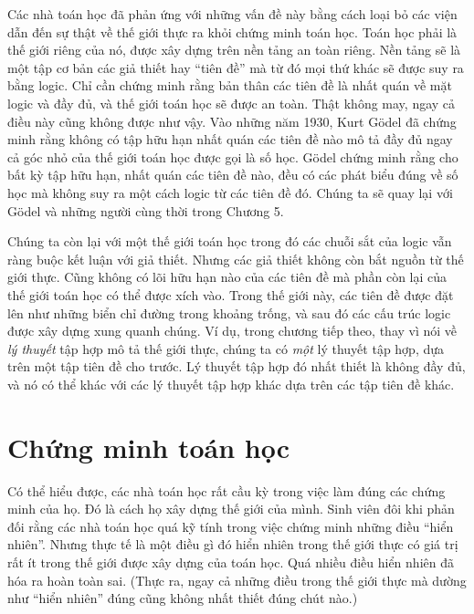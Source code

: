 Các nhà toán học đã phản ứng với những vấn đề này bằng cách loại bỏ các viện dẫn đến sự thật về thế giới thực ra khỏi chứng minh toán học. Toán học phải là thế giới riêng của nó, được xây dựng trên nền tảng an toàn riêng. Nền tảng sẽ là một tập cơ bản các giả thiết hay ``tiên đề'' mà từ đó mọi thứ khác sẽ được suy ra bằng logic. Chỉ cần chứng minh rằng bản thân các tiên đề là nhất quán về mặt logic và đầy đủ, và thế giới toán học sẽ được an toàn. Thật không may, ngay cả điều này cũng không được như vậy. Vào những năm 1930, Kurt Gödel đã chứng minh rằng không có tập hữu hạn nhất quán các tiên đề nào mô tả đầy đủ ngay cả góc nhỏ của thế giới toán học được gọi là số học. Gödel chứng minh rằng cho bất kỳ tập hữu hạn, nhất quán các tiên đề nào, đều có các phát biểu đúng về số học mà không suy ra một cách logic từ các tiên đề đó. Chúng ta sẽ quay lại với Gödel và những người cùng thời trong Chương 5.

Chúng ta còn lại với một thế giới toán học trong đó các chuỗi sắt của logic vẫn ràng buộc kết luận với giả thiết. Nhưng các giả thiết không còn bắt nguồn từ thế giới thực. Cũng không có lõi hữu hạn nào của các tiên đề mà phần còn lại của thế giới toán học có thể được xích vào. Trong thế giới này, các tiên đề được đặt lên như những biển chỉ đường trong khoảng trống, và sau đó các cấu trúc logic được xây dựng xung quanh chúng. Ví dụ, trong chương tiếp theo, thay vì nói về \emph{lý thuyết} tập hợp mô tả thế giới thực, chúng ta có \emph{một} lý thuyết tập hợp, dựa trên một tập tiên đề cho trước. Lý thuyết tập hợp đó nhất thiết là không đầy đủ, và nó có thể khác với các lý thuyết tập hợp khác dựa trên các tập tiên đề khác.

\section{Chứng minh toán học}

Có thể hiểu được, các nhà toán học rất cầu kỳ trong việc làm đúng các chứng minh của họ. Đó là cách họ xây dựng thế giới của mình. Sinh viên đôi khi phản đối rằng các nhà toán học quá kỹ tính trong việc chứng minh những điều ``hiển nhiên''. Nhưng thực tế là một điều gì đó hiển nhiên trong thế giới thực có giá trị rất ít trong thế giới được xây dựng của toán học. Quá nhiều điều hiển nhiên đã hóa ra hoàn toàn sai. (Thực ra, ngay cả những điều trong thế giới thực mà dường như ``hiển nhiên'' đúng cũng không nhất thiết đúng chút nào.)

